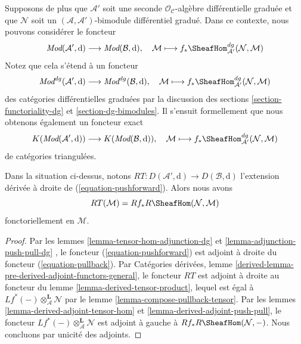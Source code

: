 \medskip\noindent
Supposons de plus que $\mathcal{A}'$ soit une seconde $\mathcal{O}_\mathcal{C}$-algèbre différentielle graduée et que $\mathcal{N}$ soit un $(\mathcal{A}, \mathcal{A}')$-bimodule différentiel gradué.
Dans ce contexte, nous pouvons considérer le foncteur
$$
\textit{Mod}(\mathcal{A}', \text{d})
\longrightarrow
\textit{Mod}(\mathcal{B}, \text{d}),\quad
\mathcal{M} \longmapsto
f_*\SheafHom^{dg}_{\mathcal{A}'}(\mathcal{N}, \mathcal{M})
$$
Notez que cela s'étend à un foncteur
$$
\textit{Mod}^{dg}(\mathcal{A}', \text{d})
\longrightarrow
\textit{Mod}^{dg}(\mathcal{B}, \text{d}),\quad
\mathcal{M} \longmapsto
f_*\SheafHom^{dg}_{\mathcal{A}'}(\mathcal{N}, \mathcal{M})
$$
des catégories différentielles graduées par la discussion des sections \ref{section-functoriality-dg}  et \ref{section-dg-bimodules}.
Il s'ensuit formellement que nous obtenons également un foncteur exact
\begin{equation}
\label{equation-pushforward}
K(\textit{Mod}(\mathcal{A}', \text{d}))
\longrightarrow
K(\textit{Mod}(\mathcal{B}, \text{d})),\quad
\mathcal{M} \longmapsto
f_*\SheafHom^{dg}_{\mathcal{A}'}(\mathcal{N}, \mathcal{M})
\end{equation}
de catégories triangulées.

\begin{lemma}
\label{lemma-compose-pushforward-hom}
Dans la situation ci-dessus, notons $RT : D(\mathcal{A}', \text{d}) \to D(\mathcal{B}, \text{d})$ l'extension dérivée à droite de (\ref{equation-pushforward}).
Alors nous avons
$$
RT(\mathcal{M}) = Rf_* R\SheafHom(\mathcal{N}, \mathcal{M})
$$
fonctoriellement en $\mathcal{M}$.
\end{lemma}

\begin{proof}
Par les lemmes \ref{lemma-tensor-hom-adjunction-dg}  et \ref{lemma-adjunction-push-pull-dg} , le foncteur (\ref{equation-pushforward}) est adjoint à droite du foncteur (\ref{equation-pullback}).
Par Catégories dérivées, lemme \ref{derived-lemma-pre-derived-adjoint-functors-general}, le foncteur $RT$ est adjoint à droite au foncteur du lemme \ref{lemma-derived-tensor-product}, lequel est égal à $Lf^*(-) \otimes_\mathcal{A}^\mathbf{L} \mathcal{N}$ par le lemme \ref{lemma-compose-pullback-tensor}.
Par les lemmes \ref{lemma-derived-adjoint-tensor-hom} et \ref{lemma-derived-adjoint-push-pull}, le foncteur $Lf^*(-) \otimes_\mathcal{A}^\mathbf{L} \mathcal{N}$ est adjoint à gauche à $Rf_* R\SheafHom(\mathcal{N}, -)$. Nous concluons par unicité des adjoints.
\end{proof}

